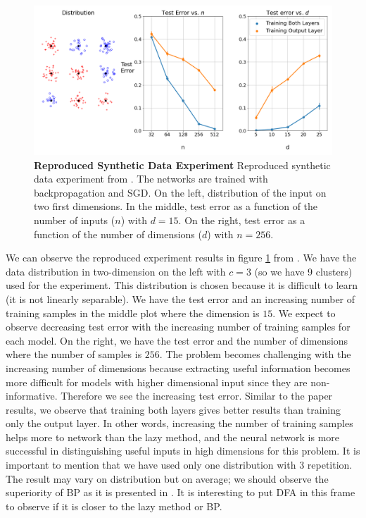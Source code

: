 \documentclass[a4paper, nobind]{templates/ociamthesis}
\begin{document}
\begin{figure}

{\centering \includegraphics[width=1\linewidth]{figures/2_syntheticData_reproduced} 

}

\caption[Reproduced Synthetic Data Experiment]{\textbf{Reproduced Synthetic Data Experiment} \newline Reproduced synthetic data experiment from \cite{chizat2020implicit}. The networks are trained with backpropagation and SGD. On the left, distribution of the input on two first dimensions. In the middle, test error as a function of the number of inputs ($n$) with $d=15$. On the right, test error as a function of the number of dimensions ($d$) with $n=256$.}\label{fig:randomData}
\end{figure}

\noindent We can observe the reproduced experiment results in figure \ref{fig:randomData} from \cite{chizat2020implicit}. We have the data distribution in two-dimension on the left with \(c=3\) (so we have 9 clusters) used for the experiment. This distribution is chosen because it is difficult to learn (it is not linearly separable). We have the test error and an increasing number of training samples in the middle plot where the dimension is \(15\). We expect to observe decreasing test error with the increasing number of training samples for each model. On the right, we have the test error and the number of dimensions where the number of samples is \(256\). The problem becomes challenging with the increasing number of dimensions because extracting useful information becomes more difficult for models with higher dimensional input since they are non-informative. Therefore we see the increasing test error. Similar to the paper results, we observe that training both layers gives better results than training only the output layer. In other words, increasing the number of training samples helps more to network than the lazy method, and the neural network is more successful in distinguishing useful inputs in high dimensions for this problem. It is important to mention that we have used only one distribution with \(3\) repetition. The result may vary on distribution but on average; we should observe the superiority of BP as it is presented in \cite{chizat2020implicit}. It is interesting to put DFA in this frame to observe if it is closer to the lazy method or BP.\\
\end{document}
